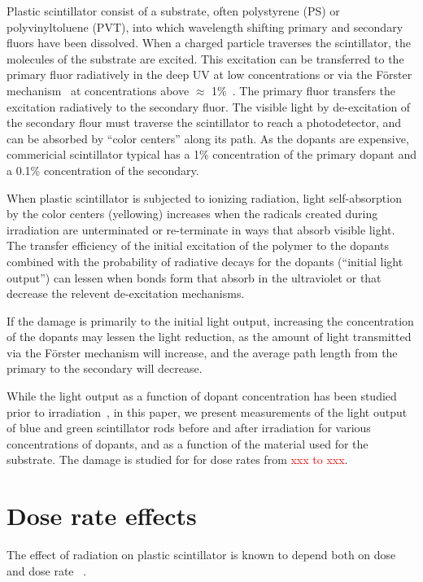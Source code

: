 \documentclass[review]{elsarticle}
\begin{document}
Plastic scintillator consist of a substrate, 
often polystyrene (PS) or polyvinyltoluene (PVT),
into which wavelength 
shifting primary and secondary fluors have been dissolved.
When a charged particle traverses the scintillator, the molecules of the substrate are excited.  
This excitation can be transferred to the primary fluor radiatively in the deep UV at low concentrations or via the F{\"o}rster mechanism~\cite{forster} at concentrations above $\approx$ 1\%~\cite{birks}.  
The primary fluor transfers the excitation radiatively to the secondary fluor.  
The visible light by de-excitation of the secondary flour
must traverse the scintillator to reach a photodetector, and can be absorbed by ``color centers'' along its path.
As the dopants are expensive, commericial scintillator typical has a 1\% concentration of the
primary dopant and a 0.1\% concentration of the secondary.


When plastic scintillator is subjected to ionizing radiation,
light self-absorption by the color centers (yellowing) increases when the radicals created during irradiation are unterminated or re-terminate in ways that absorb visible light.
The transfer efficiency of the initial excitation of the polymer to the
dopants combined with the probability of radiative decays for the dopants (``initial light output'') can lessen
when bonds form that absorb in the ultraviolet or that decrease the relevent de-excitation mechanisms.

If the damage is primarily to the initial light output, increasing the concentration 
of the dopants may lessen the light reduction, as the amount of light transmitted
via the F{\"o}rster mechanism will increase, and the average path length from the primary to the
secondary will decrease.

While the light output as a function of dopant concentration has been studied prior 
to irradiation~\cite{pla},
in this paper, we present measurements of the light output 
of blue and green scintillator rods 
before and after irradiation for various concentrations of dopants, and
as a function of the material used for the substrate.
The damage is studied for 
for dose rates from \textcolor{red}{xxx to xxx}.


\section{Dose rate effects}

The effect of radiation on plastic scintillator is known to depend
both on dose and dose rate ~\cite{sauli,34504,Wick1991472,289295,173180,173178,Giokaris1993315,gillen,1748-0221-11-10-T10004}.  
\end{document}
